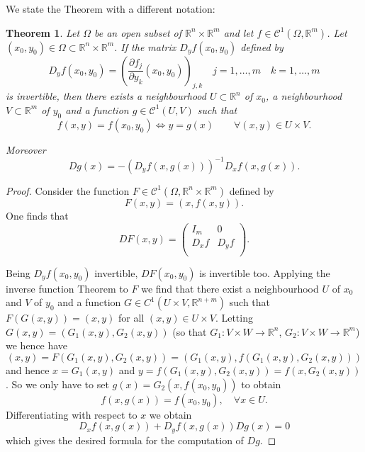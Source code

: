 \documentclass[12pt]{article}
\newcommand{\R}{\mathbb R}
\newcommand{\CC}{\mathcal C}
\newtheorem{theorem}{Theorem}
\begin{document}
We state the Theorem with a different notation:
\begin{theorem}
Let $\Omega$ be an open subset of $\R^n \times \R^m$ 
and let $f\in \CC^1(\Omega,\R^m)$. Let $(x_0,y_0)\in \Omega \subset \R^n\times\R^m$.
If the matrix $D_y f(x_0,y_0)$ defined by
\[
D_y f(x_0,y_0) = \left( \frac{\partial f_j}{\partial y_k}(x_0,y_0)\right)_{j,k}
\quad j=1,\ldots,m\quad k=1,\ldots,m
\]
is invertible, then there exists a neighbourhood $U\subset \R^n$ of $x_0$,
a neighbourhood $V\subset \R^m$ of $y_0$
and a function $g \in \CC^1(U,V)$ such that
\[
  f(x,y) = f(x_0,y_0) \Leftrightarrow y=g(x) \qquad \forall (x,y) \in U\times V.
\]

Moreover
\[
  Dg(x) = - (D_y f(x,g(x))) ^ {-1} D_x f(x,g(x)).
\]
\end{theorem}

\begin{proof}

Consider the function $F\in \CC^1(\Omega, \R^n \times \R^m)$ defined by
\[
  F(x,y)=(x,f(x,y)).
\]
One finds that
\[
  DF(x,y) = 
\left(\begin{array}{c|c}
I_m & 0 \\ \hline
D_x f & D_y f \\
\end{array}\right).
\]

Being $D_y f(x_0,y_0)$ invertible, $DF(x_0,y_0)$ is invertible too. 
Applying the inverse function Theorem to $F$ 
we find that there exist a neighbourhood $U$ of $x_0$ and $V$ of $y_0$ and 
a function $G\in C^1(U\times V,\R^{n+m})$ such that $F(G(x,y))=(x,y)$ 
for all $(x,y)\in U\times V$. Letting $G(x,y)=(G_1(x,y),G_2(x,y))$ 
(so that $G_1\colon V\times W\to\R^n$, $G_2\colon V\times W\to \R^m$)
we hence have
\[
  (x,y) = F(G_1(x,y),G_2(x,y)) = (G_1(x,y), f(G_1(x,y),G_2(x,y)))
\]
and hence $x=G_1(x,y)$ and $y=f(G_1(x,y),G_2(x,y))=f(x,G_2(x,y))$.
So we only have to set $g(x)=G_2(x,f(x_0,y_0))$ to obtain
\[
  f(x,g(x)) = f(x_0,y_0),\quad \forall x\in U.
\]
Differentiating with respect to $x$ we obtain 
\[
  D_x f(x,g(x)) + D_y f(x,g(x)) Dg(x) = 0
\]
which gives the desired formula for the computation of $Dg$.
\end{proof}

\end{document}
